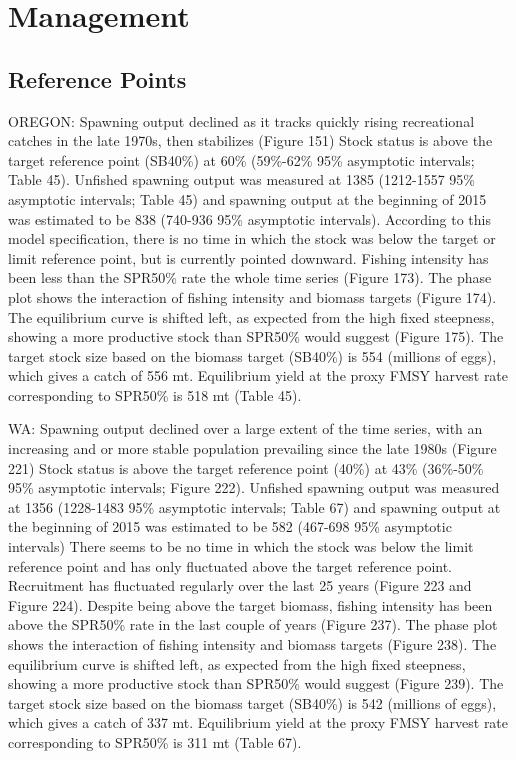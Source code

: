 \documentclass[11pt,
  english,
  letterpaper,
]{article}
\begin{document}
\hypertarget{management}{%
\section{Management}\label{management}}

\hypertarget{reference-points-1}{%
\subsection{Reference Points}\label{reference-points-1}}

OREGON: Spawning output declined as it tracks quickly rising recreational catches in the late 1970s, then stabilizes (Figure 151) Stock status is above the target reference point (SB40\%) at 60\% (59\%-62\% 95\% asymptotic intervals; Table 45). Unfished spawning output was measured at 1385 (1212-1557 95\% asymptotic intervals; Table 45) and spawning output at the beginning of 2015 was estimated to be 838 (740-936 95\% asymptotic intervals). According to this model specification, there is no time in which the stock was below the target or limit reference point, but is currently pointed downward. Fishing intensity has been less than the SPR50\% rate the whole time series (Figure 173). The phase plot shows the interaction of fishing intensity and biomass targets (Figure 174). The equilibrium curve is shifted left, as expected from the high fixed steepness, showing a more productive stock than SPR50\% would suggest (Figure 175). The target stock size based on the biomass target (SB40\%) is 554 (millions of eggs), which gives a catch of 556 mt. Equilibrium yield at the proxy FMSY harvest rate corresponding to SPR50\% is 518 mt (Table 45).

WA: Spawning output declined over a large extent of the time series, with an increasing and or more stable population prevailing since the late 1980s (Figure 221) Stock status is above the target reference point (40\%) at 43\% (36\%-50\% 95\% asymptotic intervals; Figure 222). Unfished spawning output was measured at 1356 (1228-1483 95\% asymptotic intervals; Table 67) and spawning output at the beginning of 2015 was estimated to be 582 (467-698 95\% asymptotic intervals) There seems to be no time in which the stock was below the limit reference point and has only fluctuated above the target reference point. Recruitment has fluctuated regularly over the last 25 years (Figure 223 and Figure 224). Despite being above the target biomass, fishing intensity has been above the SPR50\% rate in the last couple of years (Figure 237). The phase plot shows the interaction of fishing intensity and biomass targets (Figure 238). The equilibrium curve is shifted left, as expected from the high fixed steepness, showing a more productive stock than SPR50\% would suggest (Figure 239). The target stock size based on the biomass target (SB40\%) is 542 (millions of eggs), which gives a catch of 337 mt. Equilibrium yield at the proxy FMSY harvest rate corresponding to SPR50\% is 311 mt (Table 67).
\end{document}
